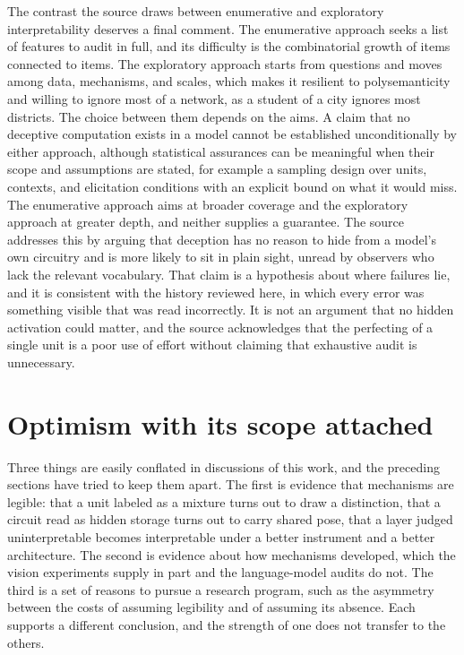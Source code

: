 \documentclass[11pt]{article}
\begin{document}
The contrast the source draws between enumerative and exploratory interpretability deserves a final comment. The enumerative approach seeks a list of features to audit in full, and its difficulty is the combinatorial growth of items connected to items. The exploratory approach starts from questions and moves among data, mechanisms, and scales, which makes it resilient to polysemanticity and willing to ignore most of a network, as a student of a city ignores most districts. The choice between them depends on the aims. A claim that no deceptive computation exists in a model cannot be established unconditionally by either approach, although statistical assurances can be meaningful when their scope and assumptions are stated, for example a sampling design over units, contexts, and elicitation conditions with an explicit bound on what it would miss. The enumerative approach aims at broader coverage and the exploratory approach at greater depth, and neither supplies a guarantee. The source addresses this by arguing that deception has no reason to hide from a model's own circuitry and is more likely to sit in plain sight, unread by observers who lack the relevant vocabulary. That claim is a hypothesis about where failures lie, and it is consistent with the history reviewed here, in which every error was something visible that was read incorrectly. It is not an argument that no hidden activation could matter, and the source acknowledges that the perfecting of a single unit is a poor use of effort without claiming that exhaustive audit is unnecessary.

\section{Optimism with its scope attached}

Three things are easily conflated in discussions of this work, and the preceding sections have tried to keep them apart. The first is evidence that mechanisms are legible: that a unit labeled as a mixture turns out to draw a distinction, that a circuit read as hidden storage turns out to carry shared pose, that a layer judged uninterpretable becomes interpretable under a better instrument and a better architecture. The second is evidence about how mechanisms developed, which the vision experiments supply in part and the language-model audits do not. The third is a set of reasons to pursue a research program, such as the asymmetry between the costs of assuming legibility and of assuming its absence. Each supports a different conclusion, and the strength of one does not transfer to the others.
\end{document}
